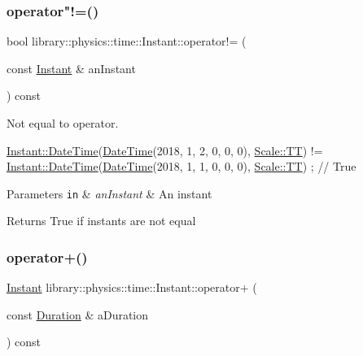 \subsubsection{\texorpdfstring{operator"!=()}{operator!=()}}
{\footnotesize\ttfamily bool library\+::physics\+::time\+::\+Instant\+::operator!= (\begin{DoxyParamCaption}\item[{const \hyperlink{classlibrary_1_1physics_1_1time_1_1_instant}{Instant} \&}]{an\+Instant }\end{DoxyParamCaption}) const}



Not equal to operator. 


\begin{DoxyCode}
\hyperlink{classlibrary_1_1physics_1_1time_1_1_instant_ac827b6ffa57ce75a3c56c462d4c872f8}{Instant::DateTime}(\hyperlink{classlibrary_1_1physics_1_1time_1_1_instant_ac827b6ffa57ce75a3c56c462d4c872f8}{DateTime}(2018, 1, 2, 0, 0, 0), 
      \hyperlink{namespacelibrary_1_1physics_1_1time_a09d2bc9fbc7b0b5f92e1419bd655e6bbadf1f3edb9115acb0a1e04209b7a9937b}{Scale::TT}) != \hyperlink{classlibrary_1_1physics_1_1time_1_1_instant_ac827b6ffa57ce75a3c56c462d4c872f8}{Instant::DateTime}(\hyperlink{classlibrary_1_1physics_1_1time_1_1_instant_ac827b6ffa57ce75a3c56c462d4c872f8}{DateTime}(2018, 1, 1, 0, 0, 0), 
      \hyperlink{namespacelibrary_1_1physics_1_1time_a09d2bc9fbc7b0b5f92e1419bd655e6bbadf1f3edb9115acb0a1e04209b7a9937b}{Scale::TT}) ; \textcolor{comment}{// True}
\end{DoxyCode}



\begin{DoxyParams}[1]{Parameters}
\mbox{\tt in}  & {\em an\+Instant} & An instant \\
\hline
\end{DoxyParams}
\begin{DoxyReturn}{Returns}
True if instants are not equal 
\end{DoxyReturn}
\mbox{\label{classlibrary_1_1physics_1_1time_1_1_instant_afa8c43afa94b882543c64e9610ccdc61}} 
\subsubsection{\texorpdfstring{operator+()}{operator+()}}
{\footnotesize\ttfamily \hyperlink{classlibrary_1_1physics_1_1time_1_1_instant}{Instant} library\+::physics\+::time\+::\+Instant\+::operator+ (\begin{DoxyParamCaption}\item[{const \hyperlink{classlibrary_1_1physics_1_1time_1_1_duration}{Duration} \&}]{a\+Duration }\end{DoxyParamCaption}) const}



